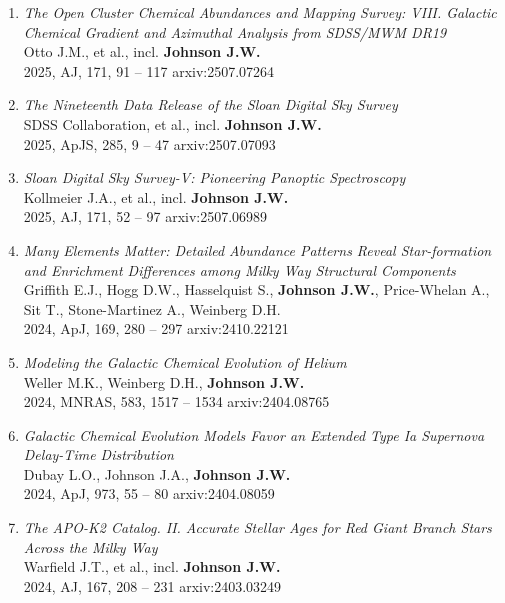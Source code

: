 \documentclass[cv.tex]{subfiles}
\begin{document}
\begin{enumerate}
	\item \textit{The Open Cluster Chemical Abundances and Mapping Survey: VIII.
	Galactic Chemical Gradient and Azimuthal Analysis from SDSS/MWM DR19}
	\\
	Otto J.M., et al., incl. \textbf{Johnson J.W.}
	\\
	2025, AJ, 171, 91 -- 117 \hfill arxiv:2507.07264

	\item \textit{The Nineteenth Data Release of the Sloan Digital Sky Survey}
	\\
	SDSS Collaboration, et al., incl. \textbf{Johnson J.W.}
	\\
	2025, ApJS, 285, 9 -- 47 \hfill arxiv:2507.07093

	\item \textit{Sloan Digital Sky Survey-V: Pioneering Panoptic Spectroscopy}
	\\
	Kollmeier J.A., et al., incl. \textbf{Johnson J.W.}
	\\
	2025, AJ, 171, 52 -- 97 \hfill arxiv:2507.06989

	\item \textit{Many Elements Matter: Detailed Abundance Patterns Reveal
	Star-formation and Enrichment Differences among Milky Way Structural
	Components}
	\\
	Griffith E.J., Hogg D.W., Hasselquist S., \textbf{Johnson J.W.},
	Price-Whelan A., Sit T., Stone-Martinez A., Weinberg D.H.
	\\
	2024, ApJ, 169, 280 -- 297 \hfill arxiv:2410.22121

	\item \textit{Modeling the Galactic Chemical Evolution of Helium}
	\\
	Weller M.K., Weinberg D.H., \textbf{Johnson J.W.}
	\\
	2024, MNRAS, 583, 1517 -- 1534 \hfill arxiv:2404.08765

	\item \textit{Galactic Chemical Evolution Models Favor an Extended Type Ia
	Supernova Delay-Time Distribution}
	\\
	Dubay L.O., Johnson J.A., \textbf{Johnson J.W.}
	\\
	2024, ApJ, 973, 55 -- 80 \hfill arxiv:2404.08059

	\item \textit{The APO-K2 Catalog. II. Accurate Stellar Ages for Red Giant
	Branch Stars Across the Milky Way}
	\\
	Warfield J.T., et al., incl. \textbf{Johnson J.W.}
	\\
	2024, AJ, 167, 208 -- 231 \hfill arxiv:2403.03249


\end{enumerate}
\end{document}
